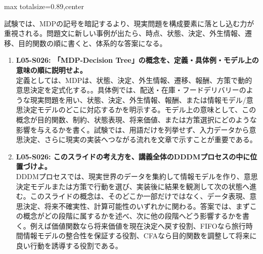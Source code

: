 \begin{minipage}[t]{0.58\textwidth}
\begin{adjustbox}{max totalsize={\textwidth}{0.89\textheight},center}
\begin{minipage}{\textwidth}
試験では、MDPの記号を暗記するより、現実問題を構成要素に落とし込む力が重視される。問題文に新しい事例が出たら、時点、状態、決定、外生情報、遷移、目的関数の順に書くと、体系的な答案になる。\par{}\begin{enumerate}\item \textbf{L05-S026: 「MDP-Decision Tree」の概念を、定義・具体例・モデル上の意味の順に説明せよ。}\\定義としては、MDPは、状態、決定、外生情報、遷移、報酬、方策で動的意思決定を定式化する。。具体例では、配送・在庫・フードデリバリーのような現実問題を用い、状態、決定、外生情報、報酬、または情報モデル/意思決定モデルのどこに対応するかを明示する。モデル上の意味として、この概念が目的関数、制約、状態表現、将来価値、または方策選択にどのような影響を与えるかを書く。試験では、用語だけを列挙せず、入力データから意思決定、さらに現実の実装へつながる流れを文章で示すことが重要である。\item \textbf{L05-S026: このスライドの考え方を、講義全体のDDDMプロセスの中に位置づけよ。}\\DDDMプロセスでは、現実世界のデータを集約して情報モデルを作り、意思決定モデルまたは方策で行動を選び、実装後に結果を観測して次の状態へ進む。このスライドの概念は、そのどこか一部だけではなく、データ表現、意思決定、将来不確実性、計算可能性のいずれかに関わる。答案では、まずこの概念がどの段階に属するかを述べ、次に他の段階へどう影響するかを書く。例えば価値関数なら将来価値を現在決定へ戻す役割、FIFOなら旅行時間情報モデルの整合性を保証する役割、CFAなら目的関数を調整して将来に良い行動を誘導する役割である。\end{enumerate}
\end{minipage}
\end{adjustbox}
\end{minipage}


